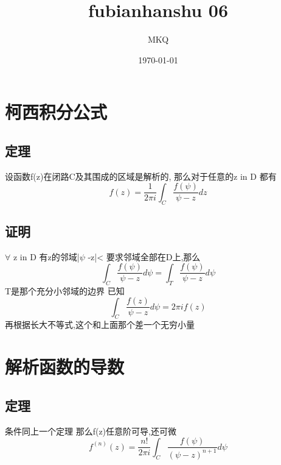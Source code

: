 \documentclass[11pt]{article}
\author{MKQ}
\date{\today}
\title{fubianhanshu 06}
\begin{document}
\maketitle
\tableofcontents

\section{柯西积分公式}
\label{sec:org56422fa}
\subsection{定理}
\label{sec:orgdd5b210}
设函数f(z)在闭路C及其围成的区域是解析的,
那么对于任意的z in D 都有
\[
f(z)=\frac{1}{2\pi i}\int_C \frac{f(\psi)}{\psi -z}dz
\]

\subsection{证明}
\label{sec:org9760876}
\(\forall\) z in D 有z的邻域|\(\psi\) -z|<\tho
要求邻域全部在D上,那么
\[
\int_C \frac{f(\psi)}{\psi -z}d\psi = \int_T \frac{f(\psi)}{\psi -z}d\psi
\]
T是那个充分小邻域的边界
已知
\[
\int_C \frac{f(z)}{\psi -z}d\psi =2\pi i f(z)
\]
再根据长大不等式,这个和上面那个差一个无穷小量
\section{解析函数的导数}
\label{sec:orgd14d672}
\subsection{定理}
\label{sec:org6e6a3bc}
条件同上一个定理
那么f(z)任意阶可导,还可微
\[
f^{(n)}(z)=\frac{n!}{2\pi i}\int_C \frac{f(\psi)}{(\psi -z)^{n+1}}d\psi
\]
\end{document}

